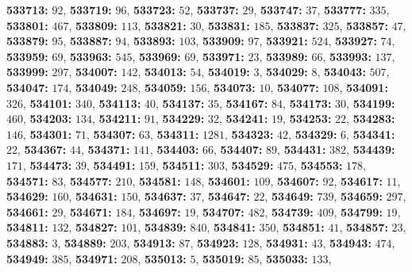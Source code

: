\textsf{\bfseries 533713:} $92$, \textsf{\bfseries 533719:} $96$, \textsf{\bfseries 533723:} $52$, \textsf{\bfseries 533737:} $29$, \textsf{\bfseries 533747:} $37$, \textsf{\bfseries 533777:} $335$, \textsf{\bfseries 533801:} $467$, \textsf{\bfseries 533809:} $113$, \textsf{\bfseries 533821:} $30$, \textsf{\bfseries 533831:} $185$, \textsf{\bfseries 533837:} $325$, \textsf{\bfseries 533857:} $47$, \textsf{\bfseries 533879:} $95$, \textsf{\bfseries 533887:} $94$, \textsf{\bfseries 533893:} $103$, \textsf{\bfseries 533909:} $97$, \textsf{\bfseries 533921:} $524$, \textsf{\bfseries 533927:} $74$, \textsf{\bfseries 533959:} $69$, \textsf{\bfseries 533963:} $545$, \textsf{\bfseries 533969:} $69$, \textsf{\bfseries 533971:} $23$, \textsf{\bfseries 533989:} $66$, \textsf{\bfseries 533993:} $137$, \textsf{\bfseries 533999:} $297$, \textsf{\bfseries 534007:} $142$, \textsf{\bfseries 534013:} $54$, \textsf{\bfseries 534019:} $3$, \textsf{\bfseries 534029:} $8$, \textsf{\bfseries 534043:} $507$, \textsf{\bfseries 534047:} $174$, \textsf{\bfseries 534049:} $248$, \textsf{\bfseries 534059:} $156$, \textsf{\bfseries 534073:} $10$, \textsf{\bfseries 534077:} $108$, \textsf{\bfseries 534091:} $326$, \textsf{\bfseries 534101:} $340$, \textsf{\bfseries 534113:} $40$, \textsf{\bfseries 534137:} $35$, \textsf{\bfseries 534167:} $84$, \textsf{\bfseries 534173:} $30$, \textsf{\bfseries 534199:} $460$, \textsf{\bfseries 534203:} $134$, \textsf{\bfseries 534211:} $91$, \textsf{\bfseries 534229:} $32$, \textsf{\bfseries 534241:} $19$, \textsf{\bfseries 534253:} $22$, \textsf{\bfseries 534283:} $146$, \textsf{\bfseries 534301:} $71$, \textsf{\bfseries 534307:} $63$, \textsf{\bfseries 534311:} $1281$, \textsf{\bfseries 534323:} $42$, \textsf{\bfseries 534329:} $6$, \textsf{\bfseries 534341:} $22$, \textsf{\bfseries 534367:} $44$, \textsf{\bfseries 534371:} $141$, \textsf{\bfseries 534403:} $66$, \textsf{\bfseries 534407:} $89$, \textsf{\bfseries 534431:} $382$, \textsf{\bfseries 534439:} $171$, \textsf{\bfseries 534473:} $39$, \textsf{\bfseries 534491:} $159$, \textsf{\bfseries 534511:} $303$, \textsf{\bfseries 534529:} $475$, \textsf{\bfseries 534553:} $178$, \textsf{\bfseries 534571:} $83$, \textsf{\bfseries 534577:} $210$, \textsf{\bfseries 534581:} $148$, \textsf{\bfseries 534601:} $109$, \textsf{\bfseries 534607:} $92$, \textsf{\bfseries 534617:} $11$, \textsf{\bfseries 534629:} $160$, \textsf{\bfseries 534631:} $150$, \textsf{\bfseries 534637:} $37$, \textsf{\bfseries 534647:} $22$, \textsf{\bfseries 534649:} $739$, \textsf{\bfseries 534659:} $297$, \textsf{\bfseries 534661:} $29$, \textsf{\bfseries 534671:} $184$, \textsf{\bfseries 534697:} $19$, \textsf{\bfseries 534707:} $482$, \textsf{\bfseries 534739:} $409$, \textsf{\bfseries 534799:} $19$, \textsf{\bfseries 534811:} $132$, \textsf{\bfseries 534827:} $101$, \textsf{\bfseries 534839:} $840$, \textsf{\bfseries 534841:} $350$, \textsf{\bfseries 534851:} $41$, \textsf{\bfseries 534857:} $23$, \textsf{\bfseries 534883:} $3$, \textsf{\bfseries 534889:} $203$, \textsf{\bfseries 534913:} $87$, \textsf{\bfseries 534923:} $128$, \textsf{\bfseries 534931:} $43$, \textsf{\bfseries 534943:} $474$, \textsf{\bfseries 534949:} $385$, \textsf{\bfseries 534971:} $208$, \textsf{\bfseries 535013:} $5$, \textsf{\bfseries 535019:} $85$, \textsf{\bfseries 535033:} $133$, 
